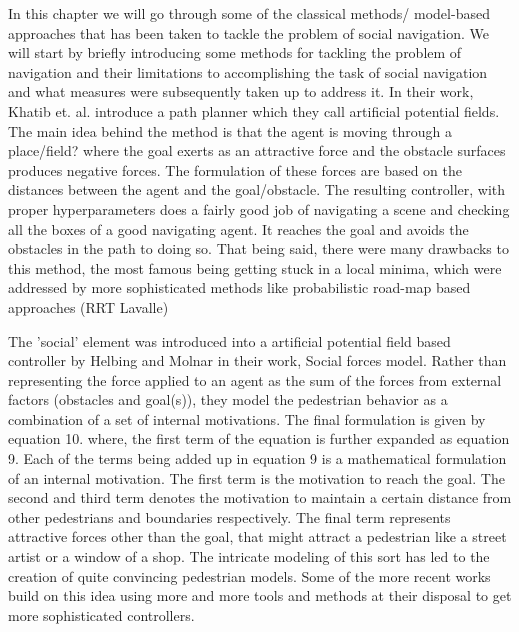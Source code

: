 In this chapter we will go through some of the classical methods/ model-based approaches that has been taken to tackle the problem of social navigation. We will start by briefly introducing some methods for tackling the problem of navigation and their limitations to accomplishing the task of social navigation and what measures were subsequently taken up to address it.
In their work, Khatib et. al. introduce a path planner which they call artificial potential fields. The main idea behind the method is that the agent is moving through a place/field? where the goal exerts as an attractive force and the obstacle surfaces produces negative forces. The formulation of these forces are based on the distances between the agent and the goal/obstacle. The resulting controller, with proper hyperparameters does a fairly good job of navigating a scene and checking all the boxes of a good navigating agent. It reaches the goal and avoids the obstacles in the path to doing so. That being said, there were many drawbacks to this method, the most famous being getting stuck in a local minima, which were addressed by more sophisticated methods like probabilistic road-map based approaches (RRT Lavalle)

The 'social' element was introduced into a artificial potential field based controller by Helbing and Molnar in their work, Social forces model.
Rather than representing the force applied to an agent as the sum of the forces from external factors (obstacles and goal(s)), they model the pedestrian behavior as a combination of a set of internal motivations. 
The final formulation is given by equation 10.
where, the first term of the equation is further expanded as equation 9.
Each of the terms being added up in equation 9 is a mathematical formulation of an internal motivation.
The first term is the motivation to reach the goal.
The second and third term denotes the motivation to maintain a certain distance from other pedestrians and boundaries respectively.
The final term represents attractive forces other than the goal, that might attract a pedestrian like a street artist or a window of a shop.
The intricate modeling of this sort has led to the creation of quite convincing pedestrian models. 
Some of the more recent works build on this idea using more and more tools and methods at their disposal to get more sophisticated controllers.

